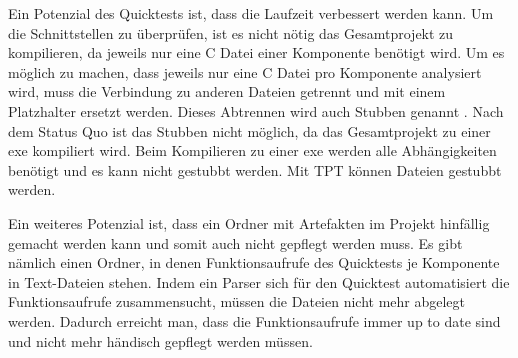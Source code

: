 Ein Potenzial des Quicktests ist, dass die Laufzeit verbessert werden kann. Um die Schnittstellen zu überprüfen, ist es
nicht nötig das Gesamtprojekt zu kompilieren, da jeweils nur eine C Datei einer Komponente benötigt wird. 
Um es möglich zu machen, dass jeweils 
nur eine C Datei pro Komponente analysiert wird, muss die Verbindung zu anderen Dateien getrennt und mit einem Platzhalter ersetzt werden.
Dieses Abtrennen wird auch Stubben genannt \parencite[S. 337]{integration}.
Nach dem Status Quo ist das Stubben nicht möglich, da das Gesamtprojekt zu 
einer \ac{exe} kompiliert wird. Beim Kompilieren zu einer \ac{exe} werden alle Abhängigkeiten benötigt und es kann nicht gestubbt werden.
Mit TPT können Dateien gestubbt werden.


Ein weiteres Potenzial ist, dass ein Ordner mit Artefakten im Projekt hinfällig gemacht werden kann und somit 
auch nicht gepflegt werden muss. Es gibt nämlich einen Ordner, in denen Funktionsaufrufe des Quicktests je Komponente
in Text-Dateien stehen. Indem ein Parser sich für den Quicktest automatisiert die Funktionsaufrufe zusammensucht, 
müssen die Dateien nicht mehr abgelegt werden.
Dadurch erreicht man, dass die Funktionsaufrufe immer up to date sind und nicht mehr händisch gepflegt werden müssen.








